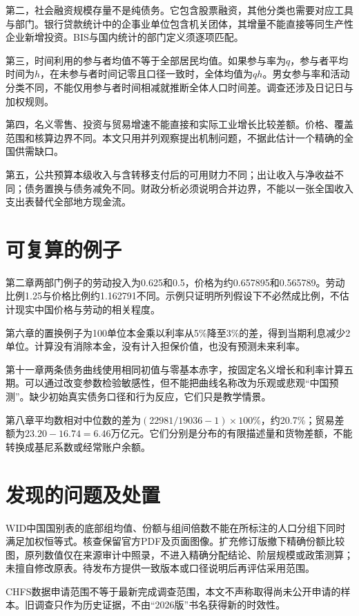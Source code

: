 \documentclass[UTF8,fontset=fandol,zihao=-4,oneside,openany]{ctexbook}
\begin{document}
第二，社会融资规模存量不是纯债务。它包含股票融资，其他分类也需要对应工具与部门。银行贷款统计中的企事业单位包含机关团体，其增量不能直接等同生产性企业新增投资。BIS与国内统计的部门定义须逐项匹配。\cite{BISCredit}

第三，时间利用的参与者均值不等于全部居民均值。如果参与率为$q$，参与者平均时间为$h$，在未参与者时间记零且口径一致时，全体均值为$qh$。男女参与率和活动分类不同，不能仅用参与者时间相减就推断全体人口时间差。调查还涉及日记日与加权规则。\cite{TimeUseSample}

第四，名义零售、投资与贸易增速不能直接和实际工业增长比较差额。价格、覆盖范围和核算边界不同。本文只用并列观察提出机制问题，不据此估计一个精确的全国供需缺口。

第五，公共预算本级收入与含转移支付后的可用财力不同；出让收入与净收益不同；债务置换与债务减免不同。财政分析必须说明合并边界，不能以一张全国收入支出表替代全部地方现金流。

\section{可复算的例子}
第二章两部门例子的劳动投入为0.625和0.5，价格为约0.657895和0.565789。劳动比例1.25与价格比例约1.162791不同。示例只证明所列假设下不必然成比例，不估计现实中国价格与劳动的相关程度。

第六章的置换例子为100单位本金乘以利率从5\%降至3\%的差，得到当期利息减少2单位。计算没有消除本金，没有计入担保价值，也没有预测未来利率。

第十一章两条债务曲线使用相同初值与零基本赤字，按固定名义增长和利率计算五期。可以通过改变参数检验敏感性，但不能把曲线名称改为乐观或悲观“中国预测”。缺少初始真实债务口径和行为反应，它们只是教学情景。

第八章平均数相对中位数的差为$(22981/19036-1)\times100\%$，约20.7\%；贸易差额为$23.20-16.74=6.46$万亿元。它们分别是分布的有限描述量和货物差额，不能转换成基尼系数或经常账户余额。

\section{发现的问题及处置}
WID中国国别表的底部组均值、份额与组间倍数不能在所标注的人口分组下同时满足加权恒等式。核查保留官方PDF及页面图像。扩充修订版撤下精确份额比较图，原列数值仅在来源审计中照录，不进入精确分配结论、阶层规模或政策测算；未擅自修改原表。待发布方提供一致版本或口径说明后再评估采用范围。

CHFS数据申请范围不等于最新完成调查范围，本文不声称取得尚未公开申请的样本。旧调查只作为历史证据，不由“2026版”书名获得新的时效性。\cite{CHFS}
\end{document}
